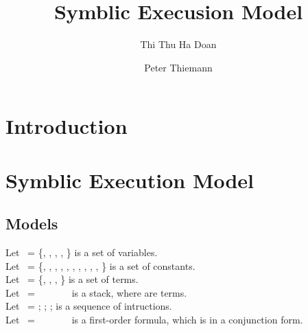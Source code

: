 \documentclass[runningheads]{llncs}
\begin{document}
%
\title{Symblic Execusion Model}
%
%
\author{Thi Thu Ha Doan\and
  Peter Thiemann}

%
%
%
\maketitle              %
%
\begin{abstract}
 

\keywords{}
\end{abstract}

%
%
%
\section{Introduction}
\label{sec:introduction}
\section{Symblic Execution Model}
\label{sec:symblic-execution-model}
\subsection{Models}
Let \VARIABLE\ = \{\VariableOne, \VariableTwo, \DOT, \VariableN, \BALANCE\} is a set of variables.
\\
Let \CONSTANT\ = \{\ConstantOne, \ConstantTwo, \DOT, \ConstantN, \AMOUNT, \SENDER, \SOURCE, \NOW, \LEVEL, \CHAINID, \SELF\} is a set of constants.
\\
Let \TERM\ = \{\TermOne, \TermTwo, \DOT, \TermN\} is a set of terms.
\\
Let \STACK\ = \StackOne\ \STACKCONCAT\ \StackTwo\ \STACKCONCAT\ \DOT\ \STACKCONCAT\ \EMPTYSTACK\ is a stack, where \StackN are terms.
\\
Let \INSTRUCTION\ = \InstructionOne; \InstructionTwo; \DOT; \InstructionN is a sequence of intructions. 
\\
Let \PREDICATE\ = \PredicateOne\ \Wedge\ \PredicateTwo\ \Wedge\ \DOT\ \Wedge\ \PredicateN\ is a first-order formula, which is in a conjunction form.
\end{document}
